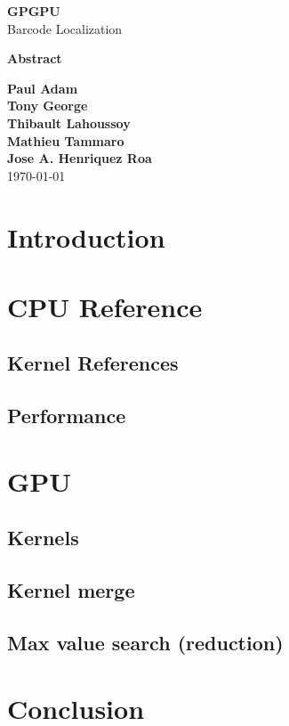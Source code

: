 \documentclass[11pt]{article}
\begin{document}
\begin{titlepage}
    \begin{center}
      \Huge \textbf{GPGPU}\\
      \vspace*{1\baselineskip}
      \huge Barcode Localization
    \vfill
    \end{center}
    \textbf{Abstract}
    \vfill
     \tableofcontents
  \begin{center}
    \vfill
    \normalsize \textbf{Paul Adam}\\
    \normalsize \textbf{Tony George}\\
    \normalsize \textbf{Thibault Lahoussoy}\\
    \normalsize \textbf{Mathieu Tammaro}\\
    \normalsize \textbf{Jose A. Henriquez Roa}\\
    \vspace*{2\baselineskip} \today \rhead{\today}
  \end{center}
\end{titlepage}

\pagestyle{fancy}
\renewcommand{\headrulewidth}{1pt}
\renewcommand{\footrulewidth}{1pt}

\begin{multicols*}{2}
  \section{Introduction}
  \section{CPU Reference}
  \subsection{Kernel References}
  \subsection{Performance}
  \section{GPU}
  \subsection{Kernels}
  \subsection{Kernel merge}
  \subsection{Max value search (reduction)}
  \section{Conclusion}
\end{multicols*}
\end{document}
